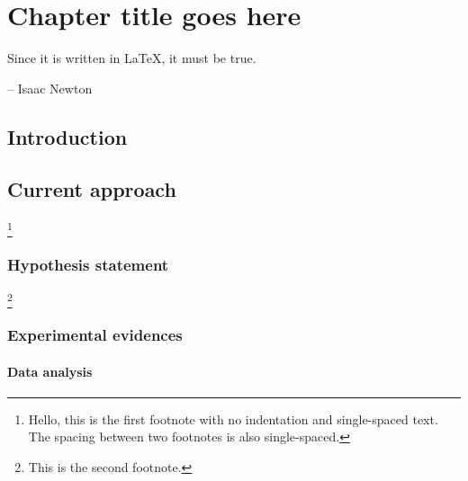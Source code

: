 \chapter{Chapter title goes here} \label{chap:chap-3}


\epigraph{Since it is written in \LaTeX, it must be true.}{-- Isaac Newton}





\section{Introduction}
\blindtext 


\section{Current approach}
\blindtext\footnote{Hello, this is the first footnote with no indentation and single-spaced text. The spacing between two footnotes is also single-spaced.}

\subsection{Hypothesis statement}
\blindtext\footnote{This is the second footnote.}


\subsection{Experimental evidences}
\blindtext


\subsubsection{Data analysis}
\blindtext